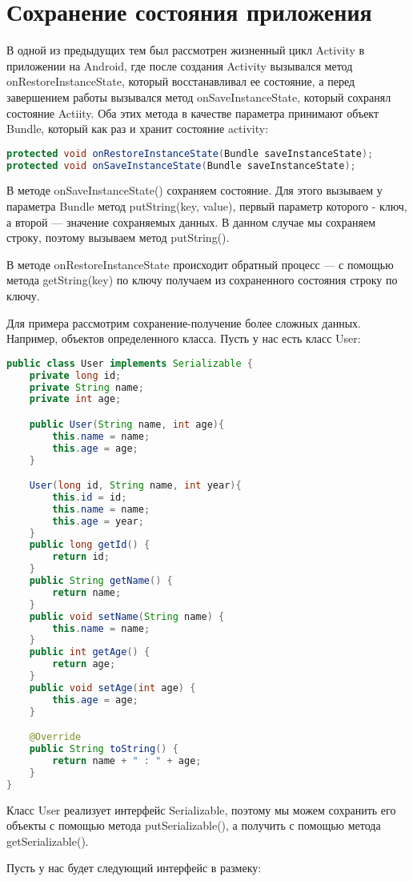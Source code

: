 \section{Сохранение состояния приложения}
В одной из предыдущих тем был рассмотрен жизненный цикл Activity в
приложении на Android, где после создания Activity вызывался метод
onRestoreInstanceState, который восстанавливал ее состояние, а перед
завершением работы вызывался метод onSaveInstanceState, который
сохранял состояние Actiity. Оба этих метода в качестве параметра
принимают объект Bundle, который как раз и хранит состояние activity:

\begin{lstlisting}[language=Java
	, label=lst:
	]
protected void onRestoreInstanceState(Bundle saveInstanceState);
protected void onSaveInstanceState(Bundle saveInstanceState);
\end{lstlisting}

В методе onSaveInstanceState() сохраняем состояние. Для этого вызываем у
параметра Bundle метод putString(key, value), первый параметр которого -
ключ, а второй --- значение сохраняемых данных. В данном случае мы
сохраняем строку, поэтому вызываем метод putString().\par
В методе onRestoreInstanceState происходит обратный процесс --- с помощью
метода getString(key) по ключу получаем из сохраненного состояния строку
по ключу.\par
Для примера рассмотрим сохранение-получение более сложных данных.
Например, объектов определенного класса. Пусть у нас есть класс User:

\begin{lstlisting}[language=Java
	, label=lst:
	]
public class User implements Serializable {
	private long id;
	private String name;
	private int age;

	public User(String name, int age){
		this.name = name;
		this.age = age;
	}

	User(long id, String name, int year){
		this.id = id;
		this.name = name;
		this.age = year;
	}
	public long getId() {
		return id;
	}
	public String getName() {
		return name;
	}
	public void setName(String name) {
		this.name = name;
	}
	public int getAge() {
		return age;
	}
	public void setAge(int age) {
		this.age = age;
	}

	@Override
	public String toString() {
		return name + " : " + age;
	}
}
\end{lstlisting}

Класс User реализует интерфейс Serializable, поэтому мы можем сохранить
его объекты с помощью метода putSerializable(), а получить с помощью
метода getSerializable().\par
Пусть у нас будет следующий интерфейс в размеку:

